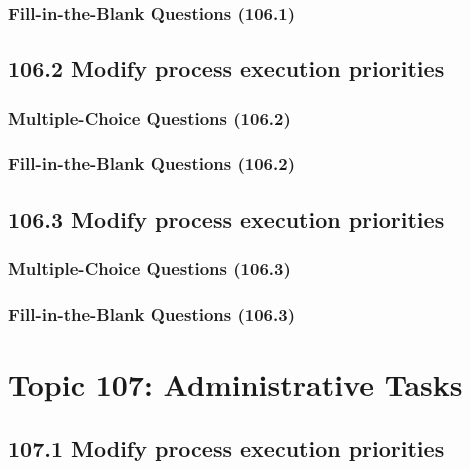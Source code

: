 \documentclass[a4paper]{report}
\begin{document}
\subsubsection*{Fill-in-the-Blank Questions (106.1)}

\subsection*{106.2 Modify process execution priorities}
\subsubsection*{Multiple-Choice Questions (106.2)}

\subsubsection*{Fill-in-the-Blank Questions (106.2)}

\subsection*{106.3 Modify process execution priorities}
\subsubsection*{Multiple-Choice Questions (106.3)}

\subsubsection*{Fill-in-the-Blank Questions (106.3)}


\section*{Topic 107: Administrative Tasks}

\subsection*{107.1 Modify process execution priorities}
\end{document}
